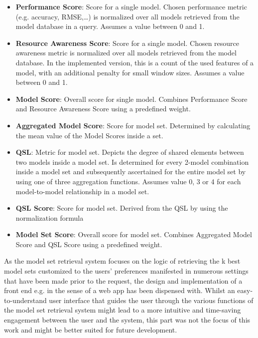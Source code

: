 \begin{itemize}
	\item \textbf{Performance Score}: Score for a single model. Chosen performance metric (e.g. accuracy, RMSE,…) is normalized over all models retrieved from the model database in a query. Assumes a value between 0 and 1.
\item \textbf{Resource Awareness Score}: Score for a single model. Chosen resource awareness metric is normalized over all models retrieved from the model database. In the implemented version, this is a count of the used features of a model, with an additional penalty for small window sizes. Assumes a value between 0 and 1.
\item \textbf{Model Score}: Overall score for single model. Combines Performance Score and Resource Awareness Score using a predefined weight. 
\item \textbf{Aggregated Model Score}: Score for model set. Determined by calculating the mean value of the Model Scores inside a set. 
\item \textbf{QSL}: Metric for model set. Depicts the degree of shared elements between two models inside a model set. Is determined for every 2-model combination inside a model set and subsequently ascertained for the entire model set by using one of three aggregation functions. Assumes value 0, 3 or 4 for each model-to-model relationship in a model set.
\item \textbf{QSL Score}: Score for model set. Derived from the QSL by using the normalization formula %
\item \textbf{Model Set Score}: Overall score for model set. Combines Aggregated Model Score and QSL Score using a predefined weight.
\end{itemize}




As the model set retrieval system focuses on the logic of retrieving the k best model sets customized to the users’ preferences manifested in numerous settings that have been made prior to the request, the design and implementation of a front end e.g. in the sense of a web app has been dispensed with. Whilst an easy-to-understand user interface that guides the user through the various functions of the model set retrieval system might lead to a more intuitive and time-saving engagement between the user and the system, this part was not the focus of this work and might be better suited for future development.
